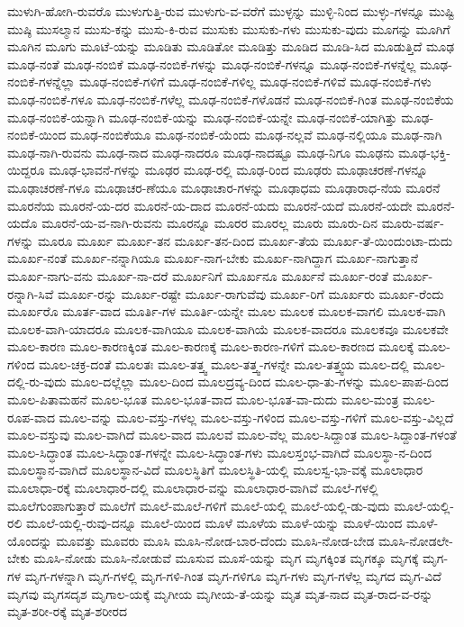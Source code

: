 {ಮುಳುಗಿ-ಹೋಗಿ-ರುವರೊ
ಮುಳುಗುತ್ತಿ-ರುವ
ಮುಳುಗು-ವ-ವರೆಗೆ
ಮುಳ್ಳನ್ನು
ಮುಳ್ಳಿ-ನಿಂದ
ಮುಳ್ಳು-ಗಳನ್ನೂ
ಮುಷ್ಟಿ
ಮುಷ್ಠಿ
ಮುಸಲ್ಮಾನ
ಮುಸು-ಕನ್ನು
ಮುಸು-ಕಿ-ರುವ
ಮುಸುಕು
ಮುಸುಕು-ಗಳು
ಮುಸುಕು-ವುದು
ಮೂಗನ್ನು
ಮೂಗಿಗೆ
ಮೂಗಿನ
ಮೂಗು
ಮೂಟೆ-ಯನ್ನು
ಮೂಡಿತು
ಮೂಡಿತೋ
ಮೂಡಿತ್ತು
ಮೂಡಿದ
ಮೂಡಿ-ಸಿದ
ಮೂಡುತ್ತಿದೆ
ಮೂಢ
ಮೂಢ-ನಂತೆ
ಮೂಢ-ನಂಬಿಕೆ
ಮೂಢ-ನಂಬಿಕೆ-ಗಳನ್ನು
ಮೂಢ-ನಂಬಿಕೆ-ಗಳನ್ನೂ
ಮೂಢ-ನಂಬಿಕೆ-ಗಳನ್ನೆಲ್ಲ
ಮೂಢ-ನಂಬಿಕೆ-ಗಳನ್ನೆಲ್ಲಾ
ಮೂಢ-ನಂಬಿಕೆ-ಗಳಿಗೆ
ಮೂಢ-ನಂಬಿಕೆ-ಗಳಿಲ್ಲ
ಮೂಢ-ನಂಬಿಕೆ-ಗಳಿವೆ
ಮೂಢ-ನಂಬಿಕೆ-ಗಳು
ಮೂಢ-ನಂಬಿಕೆ-ಗಳೂ
ಮೂಢ-ನಂಬಿಕೆ-ಗಳೆಲ್ಲ
ಮೂಢ-ನಂಬಿಕೆ-ಗಳೊಡನೆ
ಮೂಢ-ನಂಬಿಕೆ-ಗಿಂತ
ಮೂಢ-ನಂಬಿಕೆಯ
ಮೂಢ-ನಂಬಿಕೆ-ಯನ್ನಾಗಿ
ಮೂಢ-ನಂಬಿಕೆ-ಯನ್ನು
ಮೂಢ-ನಂಬಿಕೆ-ಯನ್ನೇ
ಮೂಢ-ನಂಬಿಕೆ-ಯಾಗಿತ್ತು
ಮೂಢ-ನಂಬಿಕೆ-ಯಿಂದ
ಮೂಢ-ನಂಬಿಕೆಯೂ
ಮೂಢ-ನಂಬಿಕೆ-ಯೆಂದು
ಮೂಢ-ನಲ್ಲವೆ
ಮೂಢ-ನಲ್ಲಿಯೂ
ಮೂಢ-ನಾಗಿ
ಮೂಢ-ನಾಗಿ-ರುವನು
ಮೂಢ-ನಾದ
ಮೂಢ-ನಾದರೂ
ಮೂಢ-ನಾದಷ್ಟೂ
ಮೂಢ-ನಿಗೂ
ಮೂಢನು
ಮೂಢ-ಭಕ್ತಿ-ಯಿದ್ದರೂ
ಮೂಢ-ಭಾವನೆ-ಗಳನ್ನು
ಮೂಢರ
ಮೂಢ-ರಲ್ಲಿ
ಮೂಢ-ರಿಂದ
ಮೂಢರು
ಮೂಢಾಚರಣೆ-ಗಳನ್ನೂ
ಮೂಢಾಚರಣೆ-ಗಳೂ
ಮೂಢಾಚರ-ಣೆಯೂ
ಮೂಢಾಚಾರ-ಗಳನ್ನು
ಮೂಢಾಧಮ
ಮೂಢಾರಾಧ-ನೆಯ
ಮೂರನೆ
ಮೂರನೆಯ
ಮೂರನೆ-ಯ-ದರ
ಮೂರನೆ-ಯ-ದಾದ
ಮೂರನೆ-ಯದು
ಮೂರನೆ-ಯದೆ
ಮೂರನೆ-ಯದೇ
ಮೂರನೆ-ಯದೊ
ಮೂರನೆ-ಯ-ವ-ನಾಗಿ-ರುವನು
ಮೂರನ್ನೂ
ಮೂರರ
ಮೂರಲ್ಲ
ಮೂರು
ಮೂರು-ದಿನ
ಮೂರು-ವರ್ಷ-ಗಳನ್ನು
ಮೂರೂ
ಮೂರ್ಖ
ಮೂರ್ಖ-ತನ
ಮೂರ್ಖ-ತನ-ದಿಂದ
ಮೂರ್ಖ-ತೆಯ
ಮೂರ್ಖ-ತೆ-ಯಿಂದುಂಟಾ-ದುದು
ಮೂರ್ಖ-ನಂತೆ
ಮೂರ್ಖ-ನನ್ನಾಗಿಯೂ
ಮೂರ್ಖ-ನಾಗ-ಬೇಕು
ಮೂರ್ಖ-ನಾಗಿದ್ದಾಗ
ಮೂರ್ಖ-ನಾಗುತ್ತಾನೆ
ಮೂರ್ಖ-ನಾಗು-ವನು
ಮೂರ್ಖ-ನಾ-ದರೆ
ಮೂರ್ಖನಿಗೆ
ಮೂರ್ಖನೂ
ಮೂರ್ಖನೆ
ಮೂರ್ಖ-ರಂತೆ
ಮೂರ್ಖ-ರನ್ನಾಗಿ-ಸಿವೆ
ಮೂರ್ಖ-ರನ್ನು
ಮೂರ್ಖ-ರಷ್ಟೇ
ಮೂರ್ಖ-ರಾಗುವೆವು
ಮೂರ್ಖ-ರಿಗೆ
ಮೂರ್ಖರು
ಮೂರ್ಖ-ರೆಂದು
ಮೂರ್ಖರೊ
ಮೂರ್ತ-ವಾದ
ಮೂರ್ತಿ-ಗಳ
ಮೂರ್ತಿ-ಯನ್ನೇ
ಮೂಲ
ಮೂಲಕ
ಮೂಲಕ-ವಾಗಲಿ
ಮೂಲಕ-ವಾಗಿ
ಮೂಲಕ-ವಾಗಿ-ಯಾದರೂ
ಮೂಲಕ-ವಾಗಿಯೂ
ಮೂಲಕ-ವಾಗಿಯೆ
ಮೂಲಕ-ವಾದರೂ
ಮೂಲಕವೂ
ಮೂಲಕವೇ
ಮೂಲ-ಕಾರಣ
ಮೂಲ-ಕಾರಣಕ್ಕಿಂತ
ಮೂಲ-ಕಾರಣಕ್ಕೆ
ಮೂಲ-ಕಾರಣ-ಗಳಿಗೆ
ಮೂಲ-ಕಾರಣದ
ಮೂಲಕ್ಕೆ
ಮೂಲ-ಗಳಿಂದ
ಮೂಲ-ಚಕ್ರ-ದಂತೆ
ಮೂಲತಃ
ಮೂಲ-ತತ್ತ್ವ
ಮೂಲ-ತತ್ತ್ವ-ಗಳನ್ನೇ
ಮೂಲ-ತತ್ತ್ವಯ
ಮೂಲ-ದಲ್ಲಿ
ಮೂಲ-ದಲ್ಲಿ-ರು-ವುದು
ಮೂಲ-ದಲ್ಲೆಲ್ಲಾ
ಮೂಲ-ದಿಂದ
ಮೂಲದ್ರವ್ಯ-ದಿಂದ
ಮೂಲ-ಧಾ-ತು-ಗಳನ್ನು
ಮೂಲ-ಪಾಪ-ದಿಂದ
ಮೂಲ-ಪಿತಾಮಹನೆ
ಮೂಲ-ಭೂತ
ಮೂಲ-ಭೂತ-ವಾದ
ಮೂಲ-ಭೂತ-ವಾ-ದುದು
ಮೂಲ-ಮಂತ್ರ
ಮೂಲ-ರೂಪ-ವಾದ
ಮೂಲ-ವನ್ನು
ಮೂಲ-ವಸ್ತು-ಗಳಲ್ಲ
ಮೂಲ-ವಸ್ತು-ಗಳಿಂದ
ಮೂಲ-ವಸ್ತು-ಗಳಿಗೆ
ಮೂಲ-ವಸ್ತು-ವಿಲ್ಲದೆ
ಮೂಲ-ವಸ್ತುವು
ಮೂಲ-ವಾಗಿದೆ
ಮೂಲ-ವಾದ
ಮೂಲವೆ
ಮೂಲ-ವೆಲ್ಲ
ಮೂಲ-ಸಿದ್ದಾಂತ
ಮೂಲ-ಸಿದ್ದಾಂತ-ಗಳಂತೆ
ಮೂಲ-ಸಿದ್ಧಾಂತ
ಮೂಲ-ಸಿದ್ಧಾಂತ-ಗಳನ್ನೇ
ಮೂಲ-ಸಿದ್ಧಾಂತ-ಗಳು
ಮೂಲಸ್ತಂಭ-ವಾಗಿದೆ
ಮೂಲಸ್ಥಾ-ನ-ದಿಂದ
ಮೂಲಸ್ಥಾನ-ವಾಗಿದೆ
ಮೂಲಸ್ಥಾನ-ವಿದೆ
ಮೂಲಸ್ಥಿತಿಗೆ
ಮೂಲಸ್ಥಿತಿ-ಯಲ್ಲಿ
ಮೂಲಸ್ವ-ಭಾ-ವಕ್ಕೆ
ಮೂಲಾಧಾರ
ಮೂಲಾಧಾ-ರಕ್ಕೆ
ಮೂಲಾಧಾರ-ದಲ್ಲಿ
ಮೂಲಾಧಾರ-ವನ್ನು
ಮೂಲಾಧಾರ-ವಾಗಿವೆ
ಮೂಲೆ-ಗಳಲ್ಲಿ
ಮೂಲೆಗುಂಪಾಗುತ್ತಾರೆ
ಮೂಲೆಗೆ
ಮೂಲೆ-ಮೂಲೆ-ಗಳಿಗೆ
ಮೂಲೆ-ಯಲ್ಲಿ
ಮೂಲೆ-ಯಲ್ಲಿ-ಡು-ವುದು
ಮೂಲೆ-ಯಲ್ಲಿ-ರಲಿ
ಮೂಲೆ-ಯಲ್ಲಿ-ರುವು-ದನ್ನೂ
ಮೂಲೆ-ಯಿಂದ
ಮೂಳೆ
ಮೂಳೆಯ
ಮೂಳೆ-ಯನ್ನು
ಮೂಳೆ-ಯಿಂದ
ಮೂಳೆ-ಯೊಂದನ್ನು
ಮೂವತ್ತು
ಮೂವರು
ಮೂಸಿ
ಮೂಸಿ-ನೋಡ-ಬಾರ-ದೆಂದು
ಮೂಸಿ-ನೋಡ-ಬೇಡ
ಮೂಸಿ-ನೋಡಲೇ-ಬೇಕು
ಮೂಸಿ-ನೋಡು
ಮೂಸಿ-ನೋಡುವೆ
ಮೂಸುವ
ಮೂಸೆ-ಯನ್ನು
ಮೃಗ
ಮೃಗಕ್ಕಿಂತ
ಮೃಗಕ್ಕೂ
ಮೃಗಕ್ಕೆ
ಮೃಗ-ಗಳ
ಮೃಗ-ಗಳನ್ನಾಗಿ
ಮೃಗ-ಗಳಲ್ಲಿ
ಮೃಗ-ಗಳಿ-ಗಿಂತ
ಮೃಗ-ಗಳಿಗೂ
ಮೃಗ-ಗಳು
ಮೃಗ-ಗಳೆಲ್ಲ
ಮೃಗದ
ಮೃಗ-ವಿದೆ
ಮೃಗವು
ಮೃಗಸದೃಶ
ಮೃಗಾಲ-ಯಕ್ಕೆ
ಮೃಗೀಯ
ಮೃಗೀಯ-ತೆ-ಯನ್ನು
ಮೃತ
ಮೃತ-ನಾದ
ಮೃತ-ರಾದ-ವ-ರನ್ನು
ಮೃತ-ಶರೀ-ರಕ್ಕೆ
ಮೃತ-ಶರೀರದ
}
